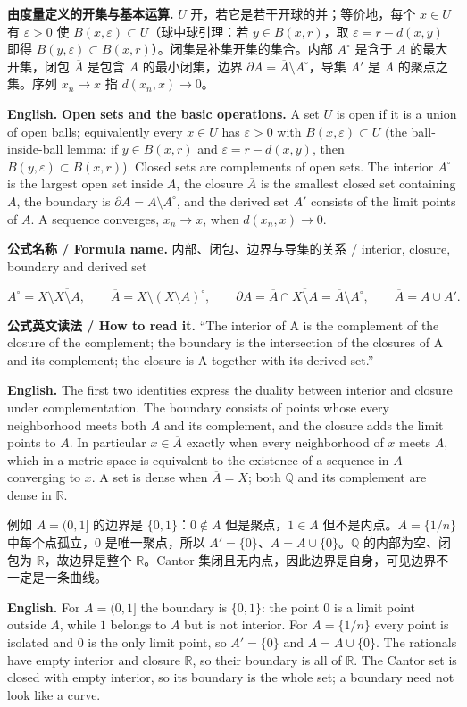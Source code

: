 \documentclass[UTF8,11pt,a4paper]{ctexart}
\newcommand{\EN}[1]{\par\noindent\textbf{English.} #1\par}
\newcommand{\READ}[1]{\par\noindent\textbf{公式英文读法 / How to read it.} #1\par}
\newcommand{\FORMULA}[2]{\par\noindent\textbf{公式名称 / Formula name.} #1 / #2\par}
\begin{document}
\noindent\textbf{由度量定义的开集与基本运算.} $U$ 开，若它是若干开球的并；等价地，每个 $x\in U$ 有 $\varepsilon>0$ 使 $B(x,\varepsilon)\subset U$（球中球引理：若 $y\in B(x,r)$，取 $\varepsilon=r-d(x,y)$ 即得 $B(y,\varepsilon)\subset B(x,r)$）。闭集是补集开集的集合。内部 $A^\circ$ 是含于 $A$ 的最大开集，闭包 $\overline A$ 是包含 $A$ 的最小闭集，边界 $\partial A=\overline A\setminus A^\circ$，导集 $A'$ 是 $A$ 的聚点之集。序列 $x_n\to x$ 指 $d(x_n,x)\to0$。
\EN{\textbf{Open sets and the basic operations.} A set $U$ is open if it is a union of open balls; equivalently every $x\in U$ has $\varepsilon>0$ with $B(x,\varepsilon)\subset U$ (the ball-inside-ball lemma: if $y\in B(x,r)$ and $\varepsilon=r-d(x,y)$, then $B(y,\varepsilon)\subset B(x,r)$). Closed sets are complements of open sets. The interior $A^\circ$ is the largest open set inside $A$, the closure $\overline A$ is the smallest closed set containing $A$, the boundary is $\partial A=\overline A\setminus A^\circ$, and the derived set $A'$ consists of the limit points of $A$. A sequence converges, $x_n\to x$, when $d(x_n,x)\to0$.}

\FORMULA{内部、闭包、边界与导集的关系}{interior, closure, boundary and derived set}
\[
A^\circ=X\setminus\overline{X\setminus A},\qquad
\overline A=X\setminus(X\setminus A)^\circ,\qquad
\partial A=\overline A\cap\overline{X\setminus A}=\overline A\setminus A^\circ,\qquad
\overline A=A\cup A'.
\]
\READ{``The interior of A is the complement of the closure of the complement; the boundary is the intersection of the closures of A and its complement; the closure is A together with its derived set.''}
\EN{The first two identities express the duality between interior and closure under complementation. The boundary consists of points whose every neighborhood meets both $A$ and its complement, and the closure adds the limit points to $A$. In particular $x\in\overline A$ exactly when every neighborhood of $x$ meets $A$, which in a metric space is equivalent to the existence of a sequence in $A$ converging to $x$. A set is dense when $\overline A=X$; both $\mathbb Q$ and its complement are dense in $\mathbb R$.}

\noindent 例如 $A=(0,1]$ 的边界是 $\{0,1\}$：$0\notin A$ 但是聚点，$1\in A$ 但不是内点。$A=\{1/n\}$ 中每个点孤立，$0$ 是唯一聚点，所以 $A'=\{0\}$、$\overline A=A\cup\{0\}$。$\mathbb Q$ 的内部为空、闭包为 $\mathbb R$，故边界是整个 $\mathbb R$。Cantor 集闭且无内点，因此边界是自身，可见边界不一定是一条曲线。
\EN{For $A=(0,1]$ the boundary is $\{0,1\}$: the point $0$ is a limit point outside $A$, while $1$ belongs to $A$ but is not interior. For $A=\{1/n\}$ every point is isolated and $0$ is the only limit point, so $A'=\{0\}$ and $\overline A=A\cup\{0\}$. The rationals have empty interior and closure $\mathbb R$, so their boundary is all of $\mathbb R$. The Cantor set is closed with empty interior, so its boundary is the whole set; a boundary need not look like a curve.}
\end{document}
